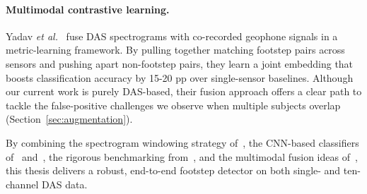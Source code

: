 \paragraph{Multimodal contrastive learning.}
Yadav \textit{et al.}~\cite{Yadav2021Contrastive} fuse DAS spectrograms with co-recorded geophone signals in a metric-learning framework. By pulling together matching footstep pairs across sensors and pushing apart non-footstep pairs, they learn a joint embedding that boosts classification accuracy by 15-20 pp over single-sensor baselines. Although our current work is purely DAS-based, their fusion approach offers a clear path to tackle the false-positive challenges we observe when multiple subjects overlap (Section~\ref{sec:augmentation}).

\medskip
By combining the spectrogram windowing strategy of~\cite{ks2021acoustic}, the CNN-based classifiers of~\cite{footstep} and~\cite{zhou2024large}, the rigorous benchmarking from~\cite{Shi2025Benchmark}, and the multimodal fusion ideas of~\cite{Yadav2021Contrastive}, this thesis delivers a robust, end-to-end footstep detector on both single- and ten-channel DAS data.
